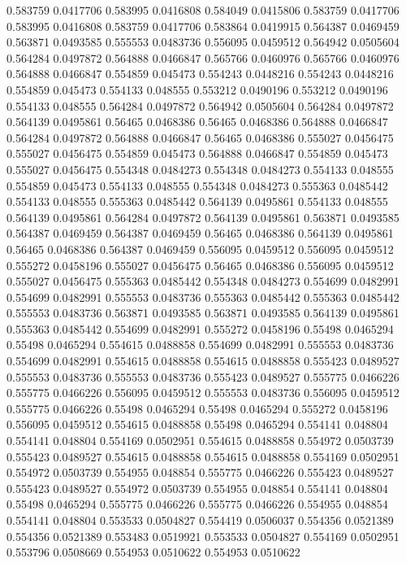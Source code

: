 0.583759 0.0417706
0.583995 0.0416808
0.584049 0.0415806
0.583759 0.0417706
0.583995 0.0416808
0.583759 0.0417706
0.583864 0.0419915
0.564387 0.0469459
0.563871 0.0493585
0.555553 0.0483736
0.556095 0.0459512
0.564942 0.0505604
0.564284 0.0497872
0.564888 0.0466847
0.565766 0.0460976
0.565766 0.0460976
0.564888 0.0466847
0.554859 0.045473
0.554243 0.0448216
0.554243 0.0448216
0.554859 0.045473
0.554133 0.048555
0.553212 0.0490196
0.553212 0.0490196
0.554133 0.048555
0.564284 0.0497872
0.564942 0.0505604
0.564284 0.0497872
0.564139 0.0495861
0.56465 0.0468386
0.56465 0.0468386
0.564888 0.0466847
0.564284 0.0497872
0.564888 0.0466847
0.56465 0.0468386
0.555027 0.0456475
0.555027 0.0456475
0.554859 0.045473
0.564888 0.0466847
0.554859 0.045473
0.555027 0.0456475
0.554348 0.0484273
0.554348 0.0484273
0.554133 0.048555
0.554859 0.045473
0.554133 0.048555
0.554348 0.0484273
0.555363 0.0485442
0.554133 0.048555
0.555363 0.0485442
0.564139 0.0495861
0.554133 0.048555
0.564139 0.0495861
0.564284 0.0497872
0.564139 0.0495861
0.563871 0.0493585
0.564387 0.0469459
0.564387 0.0469459
0.56465 0.0468386
0.564139 0.0495861
0.56465 0.0468386
0.564387 0.0469459
0.556095 0.0459512
0.556095 0.0459512
0.555272 0.0458196
0.555027 0.0456475
0.56465 0.0468386
0.556095 0.0459512
0.555027 0.0456475
0.555363 0.0485442
0.554348 0.0484273
0.554699 0.0482991
0.554699 0.0482991
0.555553 0.0483736
0.555363 0.0485442
0.555363 0.0485442
0.555553 0.0483736
0.563871 0.0493585
0.563871 0.0493585
0.564139 0.0495861
0.555363 0.0485442
0.554699 0.0482991
0.555272 0.0458196
0.55498 0.0465294
0.55498 0.0465294
0.554615 0.0488858
0.554699 0.0482991
0.555553 0.0483736
0.554699 0.0482991
0.554615 0.0488858
0.554615 0.0488858
0.555423 0.0489527
0.555553 0.0483736
0.555553 0.0483736
0.555423 0.0489527
0.555775 0.0466226
0.555775 0.0466226
0.556095 0.0459512
0.555553 0.0483736
0.556095 0.0459512
0.555775 0.0466226
0.55498 0.0465294
0.55498 0.0465294
0.555272 0.0458196
0.556095 0.0459512
0.554615 0.0488858
0.55498 0.0465294
0.554141 0.048804
0.554141 0.048804
0.554169 0.0502951
0.554615 0.0488858
0.554972 0.0503739
0.555423 0.0489527
0.554615 0.0488858
0.554615 0.0488858
0.554169 0.0502951
0.554972 0.0503739
0.554955 0.048854
0.555775 0.0466226
0.555423 0.0489527
0.555423 0.0489527
0.554972 0.0503739
0.554955 0.048854
0.554141 0.048804
0.55498 0.0465294
0.555775 0.0466226
0.555775 0.0466226
0.554955 0.048854
0.554141 0.048804
0.553533 0.0504827
0.554419 0.0506037
0.554356 0.0521389
0.554356 0.0521389
0.553483 0.0519921
0.553533 0.0504827
0.554169 0.0502951
0.553796 0.0508669
0.554953 0.0510622
0.554953 0.0510622
